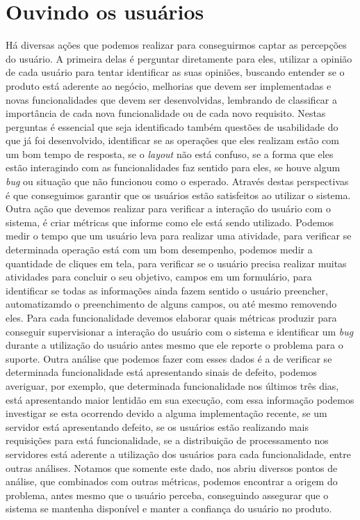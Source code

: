     \section{Ouvindo os usuários}
      Há diversas ações que podemos realizar para conseguirmos captar as percepções
      do usuário. A primeira delas é perguntar diretamente para eles, utilizar
      a opinião de cada usuário para tentar identificar as suas opiniões, buscando
      entender se o produto está aderente ao negócio, melhorias que devem ser
      implementadas e novas funcionalidades que devem ser desenvolvidas,
      lembrando de classificar a importância de cada nova funcionalidade ou de
      cada novo requisito. Nestas perguntas é essencial que seja identificado também
      questões de usabilidade do que já foi desenvolvido, identificar se as
      operações que eles realizam estão com um bom tempo de resposta, se o
      \textit{layout} não está confuso, se a forma que eles estão interagindo com
      as funcionalidades faz sentido para eles, se houve algum \textit{bug} ou
      situação que não funcionou como o esperado. Através destas perspectivas é
      que conseguimos garantir que os usuários estão satisfeitos ao utilizar o
      sistema. \newline
      Outra ação que devemos realizar para verificar a interação do usuário com o
      sistema, é criar métricas que informe como ele está sendo utilizado. Podemos
      medir o tempo que um usuário leva para realizar uma atividade, para verificar
      se determinada operação está com um bom desempenho, podemos medir a quantidade de
      cliques em tela, para verificar se o usuário precisa realizar muitas atividades
      para concluir o seu objetivo, campos em um formulário, para identificar se
      todas as informações ainda fazem sentido o usuário preencher, automatizamdo
      o preenchimento de alguns campos, ou até mesmo removendo eles. Para cada
      funcionalidade devemos elaborar quais métricas produzir para conseguir
      supervisionar a interação do usuário com o sistema e identificar um \textit{bug}
      durante a utilização do usuário antes mesmo que ele reporte o problema para
      o suporte. Outra análise que podemos fazer com esses dados é a de verificar
      se determinada funcionalidade está apresentando sinais de defeito, podemos
      averiguar, por exemplo, que determinada funcionalidade nos últimos três dias,
      está apresentando maior lentidão em sua execução, com essa informação podemos
      investigar se esta ocorrendo devido a alguma implementação recente, se um
      servidor está apresentando defeito, se os usuários estão realizando mais
      requisições para está funcionalidade, se a distribuição de processamento nos
      servidores está aderente a utilização dos usuários para cada funcionalidade,
      entre outras análises. Notamos que somente este dado, nos abriu diversos pontos
      de análise, que combinados com outras métricas, podemos encontrar a origem
      do problema, antes mesmo que o usuário perceba, conseguindo assegurar que
      o sistema se mantenha disponível e manter a confiança do usuário no produto.


